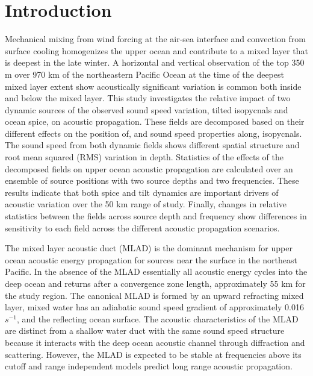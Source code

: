 \documentclass[preprint,NumberedRefs]{JASA}
\begin{document}
\section{\label{sec:intro} Introduction}
Mechanical mixing from wind forcing at the air-sea interface and convection from surface cooling homogenizes the upper ocean and contribute to a mixed layer that is deepest in the late winter\citep{cole2010seasonal}. A horizontal and vertical observation of the top 350 m over 970 km of the northeastern Pacific Ocean at the time of the deepest mixed layer extent show acoustically significant variation is common both inside and below the mixed layer\citep{colosi2020observations}. This study investigates the relative impact of two dynamic sources of the observed sound speed variation, tilted isopycnals and ocean spice, on acoustic propagation. These fields are decomposed based on their different effects on the position of, and sound speed properties along, isopycnals\cite{dzieciuch2004}. The sound speed from both dynamic fields shows different spatial structure and root mean squared (RMS) variation in depth. Statistics of the effects of the decomposed fields on upper ocean acoustic propagation are calculated over an ensemble of source positions with two source depths and two frequencies. These results indicate that both spice and tilt dynamics are important drivers of acoustic variation over the 50 km range of study. Finally, changes in relative statistics between the fields across source depth and frequency show differences in sensitivity to each field across the different acoustic propagation scenarios.

The mixed layer acoustic duct (MLAD) is the dominant mechanism for upper ocean acoustic energy propagation for sources near the surface in the northeast Pacific. In the absence of the MLAD essentially all acoustic energy cycles into the deep ocean and returns after a convergence zone length\cite{jensen2011computational}, approximately 55 km for the study region. The canonical MLAD is formed by an upward refracting mixed layer, mixed water has an adiabatic sound speed gradient of approximately 0.016 $s^{-1}$, and the reflecting ocean surface. The acoustic characteristics of the MLAD are distinct from a shallow water duct with the same sound speed structure because it interacts with the deep ocean acoustic channel through diffraction\citep{porter93} and scattering\cite{colosi2020observations}. However, the MLAD is expected to be stable at frequencies above its cutoff\citep{Urick1982Prop} and range independent models predict long range acoustic propagation.
\end{document}
